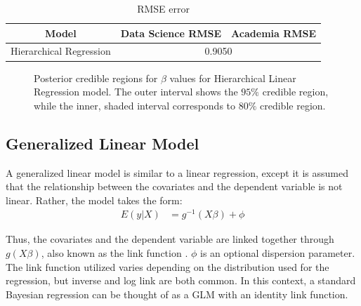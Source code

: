 \documentclass[12pt]{article}
\begin{document}
\begin{table}[ht]
  \centering
  \begin{tabular}{|c|c|c|}\hline
    Model & Data Science RMSE & Academia RMSE   \\ \hline
    Hierarchical Regression & \multicolumn{2}{c|}{0.9050} \\ \hline
  \end{tabular}
  \caption{RMSE error}
  \label{table:hierarchical-regression-rmse}
\end{table}

\begin{figure}[ht]
\centering
\caption{Posterior credible regions for $\beta$ values for Hierarchical Linear Regression model. The outer interval shows the $95\%$ credible region, while the inner, shaded interval corresponds to $80\%$ credible region.}
\label{fig:hierarchical-credible}
\end{figure}

\subsection{Generalized Linear Model}
A generalized linear model is similar to a linear regression, except it is assumed that the relationship between the covariates and the dependent variable is not linear. Rather, the model takes the form:
\begin{align*}
E(y|X) &= g^{-1}(X\beta) + \phi
\end{align*}

Thus, the covariates and the dependent variable are linked together through $g(X\beta)$, also known as the link function \cite{gelman2014bayesian}. $\phi$ is an optional dispersion parameter. The link function utilized varies depending on the distribution used for the regression, but inverse and log link are both common. In this context, a standard Bayesian regression can be thought of as a GLM with an identity link function. 
\end{document}

